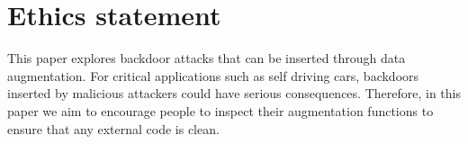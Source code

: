 \section{Ethics statement}

This paper explores backdoor attacks that can be inserted through data augmentation. For critical applications such as self driving cars, backdoors inserted by malicious attackers could have serious consequences. Therefore, in this paper we aim to encourage people to inspect their augmentation functions to ensure that any external code is clean.